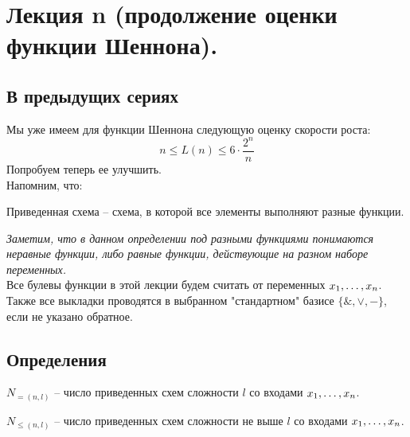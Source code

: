 \section{Лекция n (продолжение оценки функции Шеннона).} 
\subsection{В предыдущих сериях}
Мы уже имеем для функции Шеннона следующую оценку скорости роста:
$$n\leq L(n)\leq 6\cdot \frac{2^n}{n}$$
Попробуем теперь ее улучшить.\\
Напомним, что:
\begin{definition}
Приведенная схема -- схема, в которой все элементы выполняют разные функции.
\end{definition}
\textit{Заметим, что в данном определении под разными функциями понимаются неравные функции, либо равные функции, действующие на разном наборе переменных.}\\
Все булевы функции в этой лекции будем считать от переменных $x_1, \ldots, x_n$. Также все выкладки проводятся в выбранном "стандартном" базисе $\{\& ,\vee ,-\}$, если не указано обратное.
\subsection{Определения}
\begin{definition}
$N_{=(n,l)}$ -- число приведенных схем сложности $l$ со входами $x_1, \ldots, x_n$.
\end{definition}
\begin{definition}
$N_{\leq(n,l)}$ -- число приведенных схем сложности не выше $l$ со входами $x_1, \ldots, x_n$.
\end{definition}
